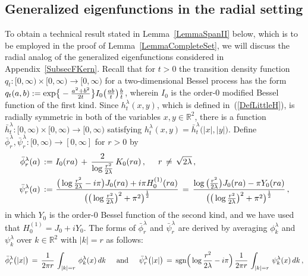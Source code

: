 \documentclass[10pt]{article}
\numberwithin{equation}{section}
\theoremstyle{definition}
\newcommand{\R}{{\mathbb R}}
\begin{document}
\begin{appendix}
\section{Generalized eigenfunctions in the radial setting }\label{SubsecFKernII}
To obtain a  technical result stated in Lemma~\ref{LemmaSpanII} below, which is to be employed  in the proof of Lemma~\ref{LemmaCompleteSet}, we will discuss the radial analog of the generalized eigenfunctions considered in Appendix~\ref{SubsecFKern}. Recall that for $t>0$ the transition density function $q_t:[0,\infty)\times [0,\infty)\rightarrow [0,\infty)$ for a two-dimensional Bessel process has the form $q_t(a,b):= \textup{exp}\big\{-\frac{a^2+b^2   }{2t  }\big\} I_0\big(\frac{ab}{t}\big)\frac{b  }{t  }$, wherein $I_0$ is the order-$0$ modified Bessel function of the first kind.  Since  $h_{t}^{\lambda}(x,y)$, which is defined  in~(\ref{DefLittleH}), is radially symmetric in both of the variables $x,y\in \R^2$, there is a function $\bar{h}_{t}^{\lambda}:[0,\infty)\times [0,\infty)\rightarrow [0,\infty)$ satisfying $h_{t}^{\lambda}(x,y)=\bar{h}_{t}^{\lambda}\big(|x|,|y|\big)$.  Define $\bar{\phi}^{\lambda}_{r},\bar{\psi}^{\lambda}_{r}:[0,\infty)\rightarrow [0,\infty] $   for $r>0$ by
\begin{align}\label{BarPsiPhi}
   \bar{\phi}^{\lambda}_{r}(a)\,:=\, &\,I_0(r a )\,+\,\frac{2 }{\log \frac{r^2}{2\lambda} }\, K_0(ra) \,, \hspace{.5cm} r\,\neq \,\sqrt{2\lambda} \,, \nonumber \\
\bar{\psi}^{\lambda}_{r}(a)\,:=\,&\,\frac{ \big(\log \frac{r^2}{2\lambda}-i\pi\big) J_0(r a )+i\pi H_0^{(1)}(ra) }{ \big(\big(\log \frac{r^2}{2\lambda}\big)^2+\pi^2\big)^{\frac{1}{2}}}\,=\,\frac{\log\big(\frac{r^2}{2\lambda}\big) J_0(r a )-\pi  Y_0(ra) }{ \big(\big(\log \frac{r^2}{2\lambda}\big)^2+\pi^2\big)^{\frac{1}{2}} } \,,
\end{align}
in which $Y_0$ is the order-$0$ Bessel function of the second kind, and we have used that $ H_0^{(1)}=J_0+iY_0$. The forms of $\bar{\phi}^{\lambda}_{r}$ and $\bar{\psi}^{\lambda}_{r}$ are derived by averaging $\phi^{\lambda}_k$ and $\psi^{\lambda}_k$ over $k\in \R^2$ with $|k|=r$ as follows:
\begin{align}\label{BarPsiPh2}
\bar{\phi}^{\lambda}_{r}\big(|x|\big)\,= \,\frac{1}{2\pi r}\,\int_{|k|=r}\, \phi^{\lambda}_k(x)\,dk  \hspace{.5cm}\text{and}  \hspace{.5cm} \bar{\psi}^{\lambda}_{r}\big(|x|\big)\,= \,\textup{sgn}\Big( \log \frac{r^2}{2\lambda}-i\pi  \Big)\,\frac{1}{2\pi r}\,\int_{|k|=r}\, \psi^{\lambda}_k(x)\,dk \,,

\end{align}
\end{appendix}
\end{document}
